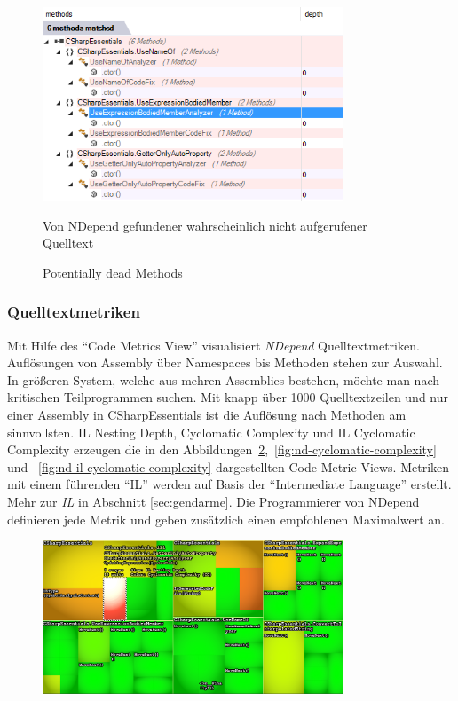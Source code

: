\begin{figure}[ht]
\centering
\includegraphics[width=0.8\textwidth]{images/dead-methods.png}
\caption{Potentially dead Methods}
\vspace{0.1cm}
Von NDepend gefundener wahrscheinlich nicht aufgerufener Quelltext
\label{fig:dead-methods}
\end{figure}

\subsubsection{Quelltextmetriken}
Mit Hilfe des \enquote{Code Metrics View} visualisiert \emph{NDepend} Quelltextmetriken. Auflösungen von Assembly über Namespaces bis Methoden stehen zur Auswahl. In größeren System, welche aus mehren Assemblies bestehen, möchte man nach kritischen Teilprogrammen suchen. Mit knapp über 1000 Quelltextzeilen und nur einer Assembly in CSharpEssentials ist die Auflösung nach Methoden am sinnvollsten. IL Nesting Depth, Cyclomatic Complexity und IL Cyclomatic Complexity erzeugen die in den Abbildungen~\ref{fig:nd-il-nesting-depth},~\ref{fig:nd-cyclomatic-complexity} und ~\ref{fig:nd-il-cyclomatic-complexity} dargestellten Code Metric Views. Metriken mit einem führenden \enquote{IL} werden auf Basis der \enquote{Intermediate Language} erstellt. Mehr zur \emph{IL} in Abschnitt \ref{sec:gendarme}. Die Programmierer von NDepend definieren jede Metrik und geben zusätzlich einen empfohlenen Maximalwert an.~\cite{ndepend-metrics}

\begin{figure}[ht]
	\centering
	\includegraphics[width=0.8\textwidth]{images/nd-il-nesting-depth.png}
	\caption{}
	\vspace{0.1cm}
	\label{fig:nd-il-nesting-depth}
\end{figure}

